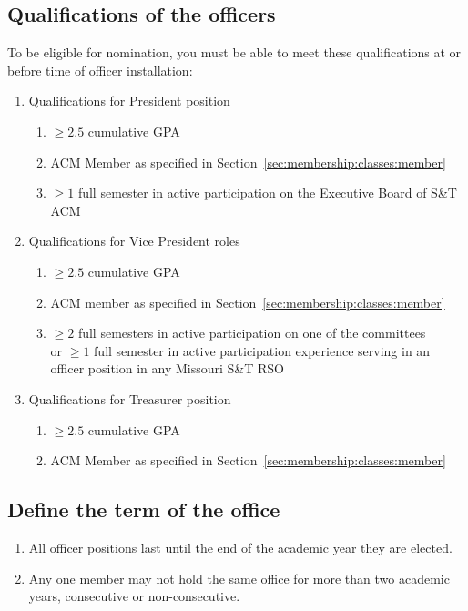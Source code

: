 \subsection{Qualifications of the officers}
To be eligible for nomination, you must be able to meet these qualifications at or before
time of officer installation:
\begin{enumerate}[label=\arabic*.]
  \item Qualifications for President position
    \begin{enumerate}[label=\arabic*.]
      \item $\geq{2.5}$ cumulative GPA
      \item ACM Member as specified in
        Section~\ref{sec:membership:classes:member}
      \item $\geq{1}$ full semester in active participation on the Executive
        Board of S\&T ACM
    \end{enumerate}
  \item Qualifications for Vice President roles
    \begin{enumerate}[label=\arabic*.]
      \item $\geq{2.5}$ cumulative GPA
      \item ACM member as specified in
        Section~\ref{sec:membership:classes:member}
      \item $\geq{2}$ full semesters in active participation on one of the
        committees\\ or $\geq{1}$ full semester in active participation
        experience serving in an officer position in any Missouri S\&T RSO
    \end{enumerate}
  \item Qualifications for Treasurer position
    \begin{enumerate}[label=\arabic*.]
      \item $\geq{2.5}$ cumulative GPA
      \item ACM Member as specified in
        Section~\ref{sec:membership:classes:member}
    \end{enumerate}
\end{enumerate}

\subsection{Define the term of the office}
\begin{enumerate}[label=\arabic*.]
  \item All officer positions last until the end of the academic year they are
    elected.
  \item Any one member may not hold the same office for more than two academic
    years, consecutive or non-consecutive.
\end{enumerate}

